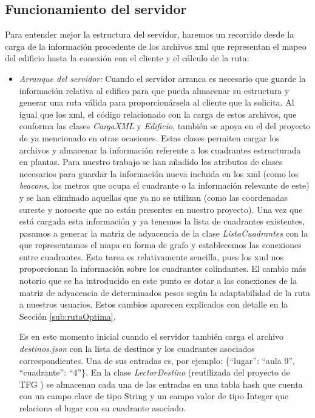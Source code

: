 \subsection{Funcionamiento del servidor}
\label{sub:func_servidor}

Para entender mejor la estructura del servidor, haremos un recorrido desde la carga de la información procedente de los archivos xml que representan el mapeo del edificio hasta la conexión con el cliente y el cálculo de la ruta: 

\begin{itemize}
	\item \textit{Arranque del servidor:} Cuando el servidor arranca es necesario que guarde la información relativa al edifico para que pueda almacenar su estructura y generar una ruta válida para proporcionársela al cliente que la solicita. Al igual que los xml, el código relacionado con la carga de estos archivos, que conforma las clases \textit{CargaXML} y \textit{Edificio}, también se apoya en el del proyecto de \citep{TFGguia} ya mencionado en otras ocasiones. Estas clases permiten cargar los archivos y almacenar la información referente a los cuadrantes estructurada en plantas. Para nuestro trabajo se han añadido los atributos de clases necesarios para guardar la información nueva incluida en los xml (como los \textit{beacons}, los metros que ocupa el cuadrante o la información relevante de este) y se han eliminado aquellas que ya no se utilizan (como las coordenadas sureste y noroeste que no están presentes en nuestro proyecto). Una vez que está cargada esta información y ya tenemos la lista de cuadrantes existentes, pasamos a generar la matriz de adyacencia de la clase \textit{ListaCuadrantes} con la que representamos el mapa en forma de grafo y establecemos las conexiones entre cuadrantes. Esta tarea es relativamente sencilla, pues los xml nos proporcionan la información sobre los cuadrantes colindantes. El cambio más notorio que se ha introducido en este punto es dotar a las conexiones de la matriz de adyacencia de determinados pesos según la adaptabilidad de la ruta a nuestros usuarios. Estos cambios aparecen explicados con detalle en la Sección \ref{sub:rutaOptima}. 
	
	Es en este momento inicial cuando el servidor también carga el archivo \textit{destinos.json} con la lista de destinos y los cuadrantes asociados correspondientes. Una de sus entradas es, por ejemplo: \{``lugar'': ``aula 9'', ``cuadrante'': ``4''\}. En la clase \textit{LectorDestino} (reutilizada del proyecto de TFG \citep{TFGguia}) se almacenan cada una de las entradas en una tabla hash que cuenta con un campo clave de tipo String y un campo valor de tipo Integer que relaciona el lugar con su cuadrante asociado.
	

\end{itemize}
